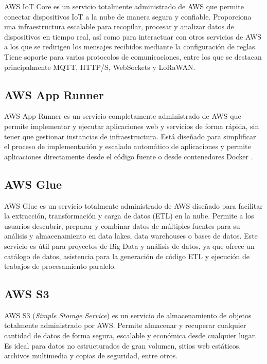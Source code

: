 AWS IoT Core \citep{aws_iot_core} es un servicio totalmente administrado de AWS que permite conectar dispositivos IoT a la nube de manera segura y confiable. Proporciona una infraestructura escalable para recopilar, procesar y analizar datos de dispositivos en tiempo real, así como para interactuar con otros servicios de AWS a los que se redirigen los mensajes recibidos mediante la configuración de reglas. Tiene soporte para varios protocolos de comunicaciones, entre los que se destacan principalmente MQTT, HTTP/S, WebSockets y LoRaWAN.


\subsection{AWS App Runner}

AWS App Runner \citep{aws_app_runner} es un servicio completamente administrado de AWS que permite implementar y ejecutar aplicaciones web y servicios de forma rápida, sin tener que gestionar instancias de infraestructura. Está diseñado para simplificar el proceso de implementación y escalado automático de aplicaciones y permite aplicaciones directamente desde el código fuente o desde contenedores Docker \cite{docker_website}.



\subsection{AWS Glue}

AWS Glue \citep{aws_glue} es un servicio totalmente administrado de AWS diseñado para facilitar la extracción, transformación y carga de datos (ETL) en la nube. Permite a los usuarios descubrir, preparar y combinar datos de múltiples fuentes para su análisis y almacenamiento en data lakes, data warehouses o bases de datos. Este servicio es útil para proyectos de Big Data y análisis de datos, ya que ofrece un catálogo de datos, asistencia para la generación de código ETL y ejecución de trabajos de procesamiento paralelo.



\subsection{AWS S3}

AWS S3 (\textit{Simple Storage Service}) \citep{aws_s3} es un servicio de almacenamiento de objetos totalmente administrado por AWS. Permite almacenar y recuperar cualquier cantidad de datos de forma segura, escalable y económica desde cualquier lugar. Es ideal para datos no estructurados de gran volumen, sitios web estáticos, archivos multimedia y copias de seguridad, entre otros.


